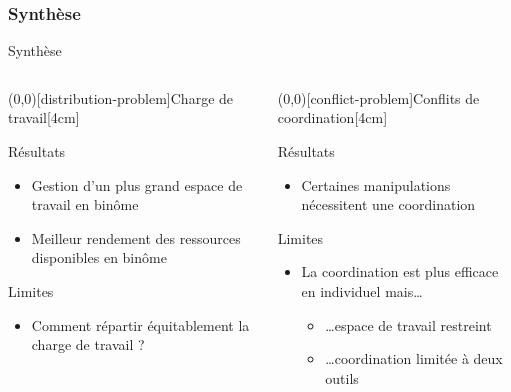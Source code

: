 \documentclass[english,french,dvips,10pt]{mybeamer}
\begin{document}
	\subsubsection{Synthèse}
	\begin{myframe}{Synthèse}
		\begin{columns}[t]
			\begin{column}{0.475\textwidth}
				\centering
				\myunode[90][shadowcolor=mygreen](0,0)[distribution-problem]{Charge de travail}[4cm]
				\begin{myplusblock}{Résultats }
					\begin{itemize}
						\item Gestion d'un plus grand espace de travail en binôme
						\item Meilleur rendement des ressources disponibles en binôme
					\end{itemize}
				\end{myplusblock}
				\begin{myminusblock}{Limites}
					\begin{itemize}
						\item Comment répartir équitablement la charge de travail ?
					\end{itemize}
				\end{myminusblock}
			\end{column}
			\begin{column}{0.475\textwidth}
				\centering
				\myunode[90][shadowcolor=mygreen](0,0)[conflict-problem]{Conflits de coordination}[4cm]
				\begin{myplusblock}{Résultats }
					\begin{itemize}
						\item Certaines manipulations nécessitent une coordination
					\end{itemize}
				\end{myplusblock}
				\begin{myminusblock}{Limites}
					\begin{itemize}
						\item La coordination est plus efficace en individuel mais\dots
							\begin{itemize}
								\item \dots{}espace de travail restreint
								\item \dots{}coordination limitée à deux outils

\end{itemize}
\end{itemize}
\end{myminusblock}
\end{column}
\end{columns}
\end{myframe}
\end{document}
